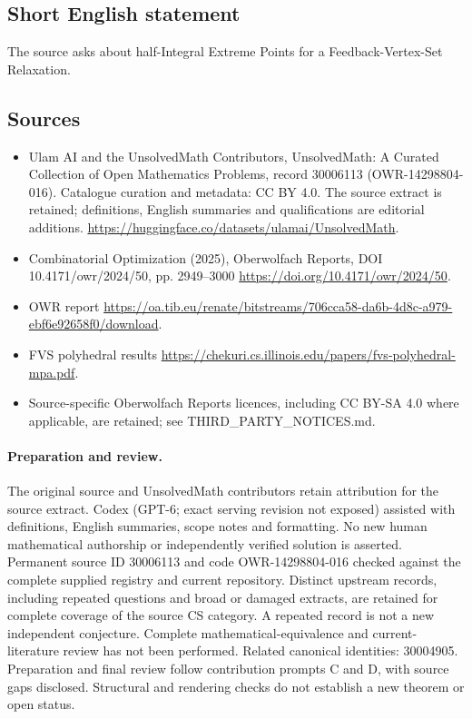 \documentclass[11pt]{article}
\begin{document}
\subsection{Short English statement}
The source asks about half-Integral Extreme Points for a Feedback-Vertex-Set Relaxation.
\subsection{Sources}
\begin{itemize}
\item[\hypertarget{source:30006113:1}{S1}] Ulam AI and the UnsolvedMath Contributors, UnsolvedMath: A Curated Collection of Open Mathematics Problems, record 30006113 (OWR-14298804-016). Catalogue curation and metadata: CC BY 4.0. The source extract is retained; definitions, English summaries and qualifications are editorial additions.
\url{https://huggingface.co/datasets/ulamai/UnsolvedMath}.
\item[\hypertarget{source:30006113:2}{S2}] Combinatorial Optimization (2025), Oberwolfach Reports, DOI 10.4171/owr/2024/50, pp. 2949--3000
\url{https://doi.org/10.4171/owr/2024/50}.
\item[\hypertarget{source:30006113:3}{S3}] OWR report
\url{https://oa.tib.eu/renate/bitstreams/706cca58-da6b-4d8c-a979-ebf6e92658f0/download}.
\item[\hypertarget{source:30006113:4}{S4}] FVS polyhedral results
\url{https://chekuri.cs.illinois.edu/papers/fvs-polyhedral-mpa.pdf}.
\item Source-specific Oberwolfach Reports licences, including CC BY-SA 4.0 where applicable, are retained; see THIRD\_PARTY\_NOTICES.md.
\end{itemize}
\paragraph{Preparation and review.}
The original source and UnsolvedMath contributors retain attribution for the source extract. Codex (GPT-6; exact serving revision not exposed) assisted with definitions, English summaries, scope notes and formatting. No new human mathematical authorship or independently verified solution is asserted. Permanent source ID 30006113 and code OWR-14298804-016 checked against the complete supplied registry and current repository. Distinct upstream records, including repeated questions and broad or damaged extracts, are retained for complete coverage of the source CS category. A repeated record is not a new independent conjecture. Complete mathematical-equivalence and current-literature review has not been performed. Related canonical identities: 30004905. Preparation and final review follow contribution prompts C and D, with source gaps disclosed. Structural and rendering checks do not establish a new theorem or open status.
\label{end:30006113}
\end{document}
